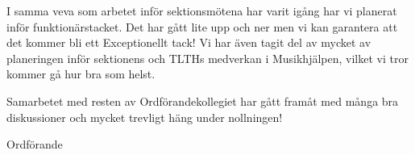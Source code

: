 \documentclass[../_main/handlingar.tex]{subfiles}
\begin{document}
I samma veva som arbetet inför sektionsmötena har varit igång har vi planerat inför funktionärstacket. Det har gått lite upp och ner men vi kan garantera att det kommer bli ett Exceptionellt tack! Vi har även tagit del av mycket av planeringen inför sektionens och TLTHs medverkan i Musikhjälpen, vilket vi tror kommer gå hur bra som helst.

Samarbetet med resten av Ordförandekollegiet har gått framåt med många bra diskussioner och mycket trevligt häng under nollningen!  


\begin{signatures}{1}
    \mvh
    \signature{\ordf}{Ordförande}
\end{signatures}
\end{document}
